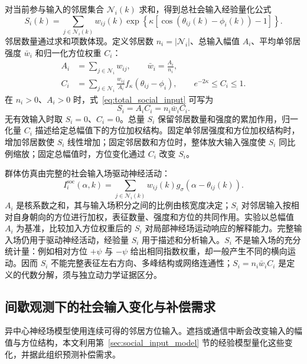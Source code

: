 \documentclass[UTF8,fontset=windows,11pt]{ctexart}
\begin{document}
对当前参与输入的邻居集合 $\mathcal N_i(k)$ 求和，得到总社会输入经验量化公式
\begin{equation}
 \boxed{\displaystyle S_i(k)=\sum_{j\in\mathcal N_i(k)}w_{ij}(k)
 \exp\!\left\{\kappa\left[\cos(\theta_{ij}(k)-\phi_i(k))-1\right]\right\}.}
 \label{eq:total_social_input}
\end{equation}
邻居数量通过求和项数体现。定义邻居数 $n_i=|\mathcal N_i|$、总输入幅值 $A_i$、平均单邻居强度 $\bar w_i$ 和归一化方位权重 $C_i$：
\begin{align}
 A_i&=\sum_{j\in\mathcal N_i}w_{ij},\qquad
 \bar w_i=\frac{A_i}{n_i},\\
 C_i&=\sum_{j\in\mathcal N_i}\frac{w_{ij}}{A_i}
 f_\kappa(\theta_{ij}-\phi_i),\qquad e^{-2\kappa}\leq C_i\leq1.
\end{align}
在 $n_i>0$、$A_i>0$ 时，式~\eqref{eq:total_social_input} 可写为
\begin{equation}
 \boxed{S_i=A_iC_i=n_i\bar w_iC_i.}
 \label{eq:social_factorization}
\end{equation}
无有效输入时取 $S_i=0$、$C_i=0$。总量 $S_i$ 保留邻居数量和强度的累加作用，归一化量 $C_i$ 描述给定总幅值下的方位加权结构。固定单邻居强度和方位加权结构时，增加邻居数使 $S_i$ 线性增加；固定邻居数和方位时，整体放大输入强度使 $S_i$ 同比例缩放；固定总幅值时，方位变化通过 $C_i$ 改变 $S_i$。

群体仿真由完整的社会输入场驱动神经活动：
\begin{equation}
 I_i^{\mathrm{soc}}(\alpha,k)=\sum_{j\in\mathcal N_i(k)}w_{ij}(k)
 g_\sigma(\alpha-\theta_{ij}(k)).
\end{equation}
$A_i$ 是核系数之和，其与输入场积分之间的比例由核宽度决定；$S_i$ 对邻居输入按相对自身朝向的方位进行加权，表征数量、强度和方位的共同作用。实验以总幅值 $A_i$ 为基准，比较加入方位权重后的 $S_i$ 对局部神经场运动响应的解释能力。完整输入场仍用于驱动神经活动，经验量 $S_i$ 用于描述和分析输入。$S_i$ 不是输入场的充分统计量：例如相对方位 $+\psi$ 与 $-\psi$ 给出相同指数权重，却一般产生不同的横向运动。因而 $S_i$ 不能完整表征左右方向、多峰结构或网络连通性；$S_i=n_i\bar w_iC_i$ 是定义的代数分解，须与独立动力学证据区分。

\subsection{间歇观测下的社会输入变化与补偿需求}

异中心神经场模型使用连续可得的邻居方位输入。遮挡或通信中断会改变输入的幅值与方位结构，本文利用第~\ref{sec:social_input_model} 节的经验模型量化这些变化，并据此组织预测补偿需求。
\end{document}
